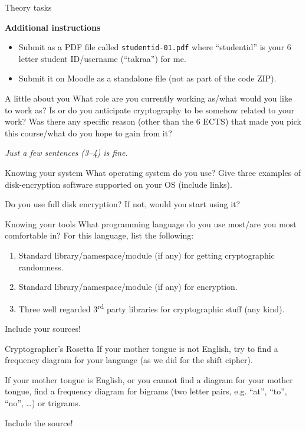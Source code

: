 \documentclass{homework}
\begin{document}
\newpage

\begin{center}
  Theory tasks
\end{center}

\textbf{Additional instructions}

\begin{itemize}
  \item Submit as a PDF file called \texttt{studentid-01.pdf} where \enquote{studentid} is your 6 letter student ID/username (\enquote{takraa}) for me.
  \item Submit it on Moodle as a standalone file (not as part of the code ZIP).
\end{itemize}

\begin{task}{A little about you}
  What role are you currently working as/what would you like to work as?
  Is or do you anticipate cryptography to be somehow related to your work?
  Was there any specific reason (other than the 6 ECTS) that made you pick this course/what do you hope to gain from it?

  \textit{Just a few sentences (3--4) is fine.}
\end{task}

\begin{task}{Knowing your system}
  What operating system do you use? Give three examples of disk-encryption software supported on your OS (include links).

  Do you use full disk encryption? If not, would you start using it?
\end{task}

\begin{task}{Knowing your tools}
  What programming language do you use most/are you most comfortable in?
  For this language, list the following:
  \begin{enumerate}
    \item Standard library/namespace/module (if any) for getting cryptographic randomness.
    \item Standard library/namespace/module (if any) for encryption.
    \item Three well regarded 3\textsuperscript{rd} party libraries for cryptographic stuff (any kind).
  \end{enumerate}

  Include your sources!
\end{task}

\begin{task}{Cryptographer's Rosetta}
  If your mother tongue is not English, try to find a frequency diagram for your language (as we did for the shift cipher).

  If your mother tongue is English, or you cannot find a diagram for your mother tongue, find a frequency diagram for bigrams (two letter pairs, e.g. \enquote{at}, \enquote{to}, \enquote{no}, \dots) or trigrams.

  Include the source!
\end{task}
\end{document}
